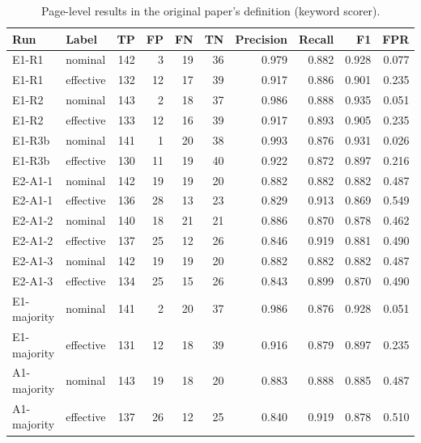 \begin{table}[t]
\centering
\small
\caption{Page-level results in the original paper's definition (keyword scorer).}
\label{tab:e7-page}
\begin{tabular}{llrrrrrrrr}
\toprule
Run & Label & TP & FP & FN & TN & Precision & Recall & F1 & FPR \\
\midrule
E1-R1 & nominal & 142 & 3 & 19 & 36 & 0.979 & 0.882 & 0.928 & 0.077 \\
E1-R1 & effective & 132 & 12 & 17 & 39 & 0.917 & 0.886 & 0.901 & 0.235 \\
E1-R2 & nominal & 143 & 2 & 18 & 37 & 0.986 & 0.888 & 0.935 & 0.051 \\
E1-R2 & effective & 133 & 12 & 16 & 39 & 0.917 & 0.893 & 0.905 & 0.235 \\
E1-R3b & nominal & 141 & 1 & 20 & 38 & 0.993 & 0.876 & 0.931 & 0.026 \\
E1-R3b & effective & 130 & 11 & 19 & 40 & 0.922 & 0.872 & 0.897 & 0.216 \\
E2-A1-1 & nominal & 142 & 19 & 19 & 20 & 0.882 & 0.882 & 0.882 & 0.487 \\
E2-A1-1 & effective & 136 & 28 & 13 & 23 & 0.829 & 0.913 & 0.869 & 0.549 \\
E2-A1-2 & nominal & 140 & 18 & 21 & 21 & 0.886 & 0.870 & 0.878 & 0.462 \\
E2-A1-2 & effective & 137 & 25 & 12 & 26 & 0.846 & 0.919 & 0.881 & 0.490 \\
E2-A1-3 & nominal & 142 & 19 & 19 & 20 & 0.882 & 0.882 & 0.882 & 0.487 \\
E2-A1-3 & effective & 134 & 25 & 15 & 26 & 0.843 & 0.899 & 0.870 & 0.490 \\
E1-majority & nominal & 141 & 2 & 20 & 37 & 0.986 & 0.876 & 0.928 & 0.051 \\
E1-majority & effective & 131 & 12 & 18 & 39 & 0.916 & 0.879 & 0.897 & 0.235 \\
A1-majority & nominal & 143 & 19 & 18 & 20 & 0.883 & 0.888 & 0.885 & 0.487 \\
A1-majority & effective & 137 & 26 & 12 & 25 & 0.840 & 0.919 & 0.878 & 0.510 \\
\bottomrule
\end{tabular}
\end{table}
